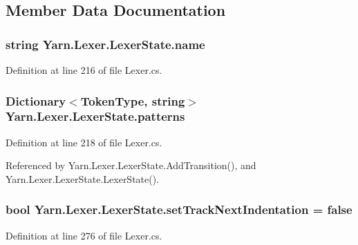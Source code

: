 \subsection{Member Data Documentation}
\hypertarget{a00130_aeb8debd0d81a76e90f083f0bf407573e}{
\subsubsection[{name}]{\setlength{\rightskip}{0pt plus 5cm}string Yarn.\-Lexer.\-Lexer\-State.\-name}}\label{a00130_aeb8debd0d81a76e90f083f0bf407573e}


Definition at line 216 of file Lexer.\-cs.

\hypertarget{a00130_a951f91e9522ffe84851f2e25e9445106}{
\subsubsection[{patterns}]{\setlength{\rightskip}{0pt plus 5cm}Dictionary$<${\bf Token\-Type}, string$>$ Yarn.\-Lexer.\-Lexer\-State.\-patterns\hspace{0.3cm}{\ttfamily [private]}}}\label{a00130_a951f91e9522ffe84851f2e25e9445106}


Definition at line 218 of file Lexer.\-cs.



Referenced by Yarn.\-Lexer.\-Lexer\-State.\-Add\-Transition(), and Yarn.\-Lexer.\-Lexer\-State.\-Lexer\-State().

\hypertarget{a00130_ad8b6ccac53bedd9dc202ffe6ac5698b2}{
\subsubsection[{set\-Track\-Next\-Indentation}]{\setlength{\rightskip}{0pt plus 5cm}bool Yarn.\-Lexer.\-Lexer\-State.\-set\-Track\-Next\-Indentation = false}}\label{a00130_ad8b6ccac53bedd9dc202ffe6ac5698b2}


Definition at line 276 of file Lexer.\-cs.



